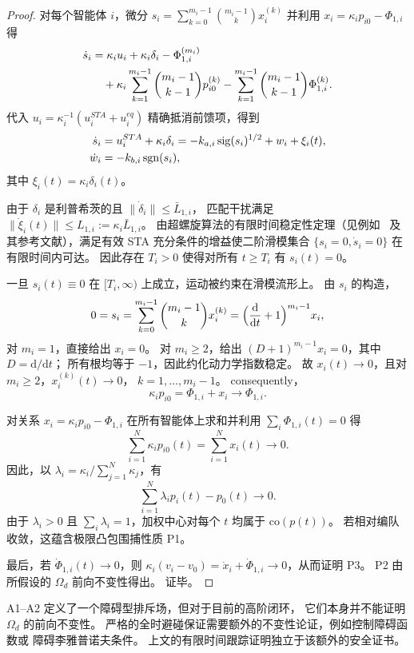 \begin{proof}
对每个智能体 $i$，微分 $s_i=\sum_{k=0}^{m_i-1}\binom{m_i-1}{k}x_i^{(k)}$
并利用 $x_i=\kappa_i p_{i0}-\Phi_{1,i}$ 得
\begin{align}
\dot s_i
&=\kappa_i u_i+\kappa_i\delta_i-\Phi_{1,i}^{(m_i)} \notag\\
&\quad
   +\kappa_i\sum_{k=1}^{m_i-1}\binom{m_i-1}{k-1}p_{i0}^{(k)}
   -\sum_{k=1}^{m_i-1}\binom{m_i-1}{k-1}\Phi_{1,i}^{(k)}.
\end{align}
代入 $u_i=\kappa_i^{-1}(u_i^{STA}+u_i^{eq})$ 精确抵消前馈项，得到
\begin{align}
\dot s_i
&=u_i^{STA}+\kappa_i\delta_i
 =-k_{a,i}\operatorname{sig}(s_i)^{1/2}+w_i+\xi_i(t),\\
\dot w_i&=-k_{b,i}\operatorname{sgn}(s_i),
\end{align}
其中 $\xi_i(t)=\kappa_i\delta_i(t)$。

由于 $\delta_i$ 是利普希茨的且 $\|\dot\delta_i\|\le\bar L_{1,i}$，
匹配干扰满足 $\|\dot\xi_i(t)\|\le L_{1,i}:=\kappa_i\bar L_{1,i}$。
由超螺旋算法的有限时间稳定性定理（见例如~\cite{seeberStabilityProofWellestablished2017}
及其参考文献），满足有效 STA 充分条件的增益使二阶滑模集合
$\{s_i=0,\dot s_i=0\}$ 在有限时间内可达。
因此存在 $T_i>0$ 使得对所有 $t\ge T_i$ 有 $s_i(t)=0$。

一旦 $s_i(t)\equiv 0$ 在 $[T_i,\infty)$ 上成立，运动被约束在滑模流形上。
由 $s_i$ 的构造，
\[
0=s_i=\sum_{k=0}^{m_i-1}\binom{m_i-1}{k}x_i^{(k)}
   =\Bigl(\frac{\mathrm d}{\mathrm dt}+1\Bigr)^{m_i-1}x_i,
\]
对 $m_i=1$，直接给出 $x_i=0$。
对 $m_i\ge2$，给出 $(D+1)^{m_i-1}x_i=0$，其中 $D=\mathrm d/\mathrm dt$；
所有根均等于 $-1$，因此约化动力学指数稳定。
故 $x_i(t)\to0$，且对 $m_i\ge2$，$x_i^{(k)}(t)\to0$，
$k=1,\dots,m_i-1$。
 consequently，
\[
\kappa_i p_{i0}=\Phi_{1,i}+x_i\longrightarrow \Phi_{1,i}.
\]

对关系 $x_i=\kappa_i p_{i0}-\Phi_{1,i}$ 在所有智能体上求和并利用
$\sum_i\Phi_{1,i}(t)=0$ 得
\[
    \sum_{i=1}^N\kappa_i p_{i0}(t)=\sum_{i=1}^Nx_i(t)\to0.
\]
因此，以 $\lambda_i=\kappa_i/\sum_{j=1}^N\kappa_j$，有
\[
    \sum_{i=1}^N\lambda_i p_i(t)-p_0(t)\to0.
\]
由于 $\lambda_i>0$ 且 $\sum_i\lambda_i=1$，加权中心对每个 $t$ 均属于
$\mathrm{co}(p(t))$。
若相对编队收敛，这蕴含极限凸包围捕性质 P1。

最后，若 $\dot\Phi_{1,i}(t)\to0$，则
$\kappa_i(v_i-v_0)=\dot x_i+\dot\Phi_{1,i}\to0$，从而证明 P3。
P2 由所假设的 $\Omega_d$ 前向不变性得出。
证毕。
\end{proof}

\begin{remark}
A1--A2 定义了一个障碍型排斥场，但对于目前的高阶闭环，
它们本身并不能证明 $\Omega_d$ 的前向不变性。
严格的全时避碰保证需要额外的不变性论证，例如控制障碍函数或
障碍李雅普诺夫条件。
上文的有限时间跟踪证明独立于该额外的安全证书。
\end{remark}